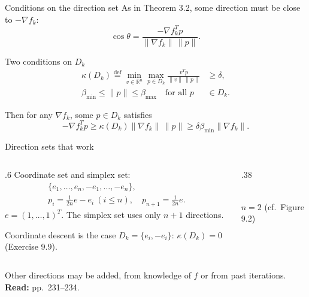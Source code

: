 \documentclass[12pt,aspectratio=169]{beamer}
\newcommand{\readpp}[1]{{\color{red!80!black}\textbf{Read:} #1}}
\newcommand{\R}{\mathbb{R}}
\begin{document}
\begin{frame}{Conditions on the direction set}
  As in Theorem 3.2, some direction must be close to $-\nabla f_k$:
  \begin{equation}
    \cos\theta = \frac{-\nabla f_k^Tp}{\|\nabla f_k\|\,\|p\|}. \tag{9.20}
  \end{equation}
  \begin{block}{Two conditions on $D_k$}
    \vspace{-1ex}
    \begin{align}
      \kappa(D_k) \overset{\text{def}}{=} \min_{v\in\R^n}\max_{p\in D_k}\frac{v^Tp}{\|v\|\,\|p\|} &\ge \delta, \tag{9.21}\\
      \beta_{\min}\le\|p\|\le\beta_{\max} \quad\text{for all } p &\in D_k. \tag{9.22}
    \end{align}
  \end{block}
  Then for any $\nabla f_k$, some $p\in D_k$ satisfies
  \[
    -\nabla f_k^Tp \ge \kappa(D_k)\|\nabla f_k\|\,\|p\| \ge \delta\beta_{\min}\|\nabla f_k\|.
  \]
\end{frame}

\begin{frame}{Direction sets that work}
  \begin{columns}[c]
    \begin{column}{.6\textwidth}
      Coordinate set and simplex set:
      \begin{gather}
        \{e_1,\dots,e_n,-e_1,\dots,-e_n\}, \tag{9.23}\\
        p_i=\tfrac{1}{2n}e-e_i\ (i\le n),\quad p_{n+1}=\tfrac{1}{2n}e. \tag{9.24}
      \end{gather}
      $e=(1,\dots,1)^T$. The simplex set uses only $n+1$ directions.

      \vspace{1ex}
      Coordinate descent is the case $D_k=\{e_i,-e_i\}$: $\kappa(D_k)=0$ (Exercise 9.9).
    \end{column}
    \begin{column}{.38\textwidth}
      \centering
      \\[1ex]
      $n=2$ (cf.\ Figure 9.2)
    \end{column}
  \end{columns}
  \vspace{1ex}
  Other directions may be added, from knowledge of $f$ or from past iterations.
  \readpp{pp.~231--234.}
\end{frame}
\end{document}
